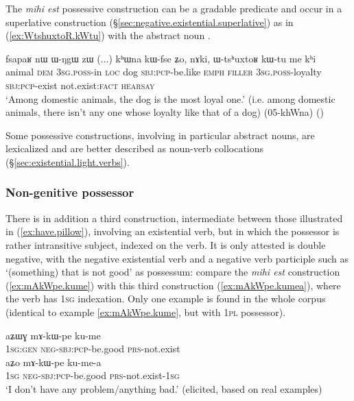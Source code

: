 The \textit{mihi est} possessive construction can be a gradable predicate and occur in a superlative construction (§\ref{sec:negative.existential.superlative}) as in (\ref{ex:WtshuxtoR.kWtu}) with the abstract noun .  

\begin{exe}
\ex \label{ex:WtshuxtoR.kWtu}
\gll  fsapaʁ nɯ ɯ-ŋgɯ zɯ (...) kʰɯna kɯ-fse ʑo, nɤki, ɯ-tsʰuxtoʁ kɯ-tu me kʰi \\
animal \textsc{dem} \textsc{3sg}.\textsc{poss}-in \textsc{loc} {  } dog \textsc{sbj}:\textsc{pcp}-be.like \textsc{emph} \textsc{filler} \textsc{3sg}.\textsc{poss}-loyalty \textsc{sbj}:\textsc{pcp}-exist not.exist:\textsc{fact} \textsc{hearsay} \\
\glt  `Among domestic animals, the dog is the most loyal one.' (i.e. among domestic animals, there isn't any one whose loyalty like that of a dog) (05-khWna)
()
\end{exe}


Some possessive constructions, involving in particular abstract nouns,  are lexicalized and are better described as noun-verb collocations (§\ref{sec:existential.light.verbs}).

 \subsubsection{Non-genitive possessor} \label{sec:possessive.existential2}
There is in addition a third construction, intermediate between those illustrated in (\ref{ex:have.pillow}), involving an existential verb, but in which the possessor is rather intransitive subject, indexed on the verb. It is only attested is double negative, with the negative existential verb  and a negative verb participle such as  `(something) that is not good' as possessum: compare the \textit{mihi est} construction (\ref{ex:mAkWpe.kume}) with this third construction (\ref{ex:mAkWpe.kumea}), where the verb has \textsc{1sg} indexation. Only one example is found in the whole corpus (identical to example \ref{ex:mAkWpe.kume}, but with \textsc{1pl} possessor).
 
\begin{exe}
\ex 
\begin{xlist}
\ex \label{ex:mAkWpe.kume}
\gll aʑɯɣ mɤ-kɯ-pe ku-me \\
\textsc{1sg}:\textsc{gen} \textsc{neg}-\textsc{sbj}:\textsc{pcp}-be.good \textsc{prs}-not.exist \\
\ex \label{ex:mAkWpe.kumea}
\gll aʑo mɤ-kɯ-pe ku-me-a \\
 \textsc{1sg}  \textsc{neg}-\textsc{sbj}:\textsc{pcp}-be.good \textsc{prs}-not.exist-\textsc{1sg} \\
 \glt `I don't have any problem/anything bad.' (elicited, based on real examples) 
 \end{xlist} 
\end{exe}

